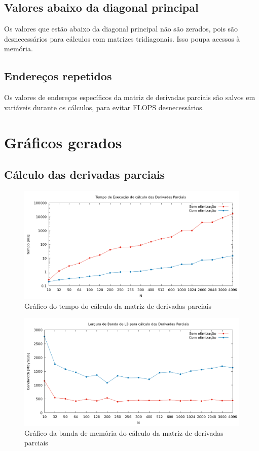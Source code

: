 \documentclass{article}
\begin{document}
\subsection{Valores abaixo da diagonal principal}
Os valores que estão abaixo da diagonal principal não são zerados, pois são desnecessários para cálculos com matrizes tridiagonais.
Isso poupa acessos à memória.

\subsection{Endereços repetidos}
Os valores de endereços específicos da matriz de derivadas parciais são salvos em variáveis durante os cálculos, para evitar FLOPS desnecessários.

\newpage

\section{Gráficos gerados}
\subsection{Cálculo das derivadas parciais}

\begin{figure}[htp]
    \centering
    \includegraphics[width=12cm]{tempo_derivadas.png}
    \caption{Gráfico do tempo do cálculo da matriz de derivadas parciais}
    \label{fig:tempo_derivadas}
\end{figure}

\begin{figure}[htp]
    \centering
    \includegraphics[width=12cm]{l3_derivadas.png}
    \caption{Gráfico da banda de memória do cálculo da matriz de derivadas parciais}
    \label{fig:l3_derivadas}
\end{figure}
\end{document}
